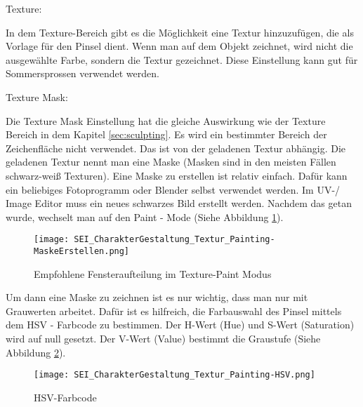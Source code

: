     Texture:

    In dem Texture-Bereich gibt es die Möglichkeit eine Textur hinzuzufügen, die als Vorlage für den Pinsel dient.
    Wenn man auf dem Objekt zeichnet, wird nicht die ausgewählte Farbe, sondern die Textur gezeichnet. Diese
    Einstellung kann gut für Sommersprossen verwendet werden.


    Texture Mask:

    Die Texture Mask Einstellung hat die gleiche Auswirkung wie der Texture Bereich in dem Kapitel \ref{sec:sculpting}.
    Es wird ein bestimmter Bereich der Zeichenfläche nicht verwendet. Das ist von der geladenen Textur abhängig.
    Die geladenen Textur nennt man eine Maske (Masken sind in den meisten Fällen schwarz-weiß Texturen).
    Eine Maske zu erstellen ist relativ einfach. Dafür kann ein beliebiges Fotoprogramm oder Blender selbst verwendet
    werden. Im UV-/ Image Editor muss ein neues schwarzes Bild erstellt werden. Nachdem das getan wurde, wechselt man
    auf den Paint - Mode (Siehe Abbildung \ref{picture:paint_mode}).

    \begin{figure}[H]
        \centering
        \texttt{[image: SEI\_CharakterGestaltung\_Textur\_Painting-MaskeErstellen.png]}
        \caption{Empfohlene Fensteraufteilung im Texture-Paint Modus}
        \label{picture:paint_mode}
    \end{figure}

    Um dann eine Maske zu zeichnen ist es nur wichtig, dass man nur mit Grauwerten arbeitet. Dafür ist es hilfreich,
    die Farbauswahl des Pinsel mittels dem HSV - Farbcode zu bestimmen. Der H-Wert (Hue) und S-Wert (Saturation) wird
    auf null gesetzt. Der V-Wert (Value) bestimmt die Graustufe (Siehe Abbildung \ref{picture:hsv_color_code}).

    \begin{figure}[H]
        \centering
        \texttt{[image: SEI\_CharakterGestaltung\_Textur\_Painting-HSV.png]}
        \caption{HSV-Farbcode}
        \label{picture:hsv_color_code}
    \end{figure}
\flushbottom